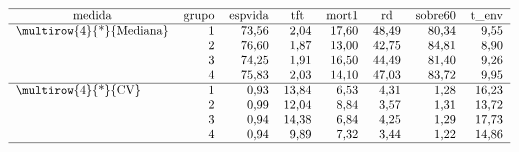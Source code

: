\documentclass[10pt,twoside]{article}
\begin{document}
\begin{table}[!ht]
\centering
\caption{Resumo estatístico das variáveis demográficas dos grupos obtidos pelo método das $k$-médias.}
\label{medg}
\[ \begin{tabular}{lrrrrrrr}
\hline
\multicolumn{1}{c}{medida} & \multicolumn{1}{c}{grupo} & \multicolumn{1}{c}{espvida} & \multicolumn{1}{c}{tft} & \multicolumn{1}{c}{mort1} & \multicolumn{1}{c}{rd} & \multicolumn{1}{c}{sobre60} & \multicolumn{1}{c}{t\_env} \\ \hline
\multirow{4}{*}{Mediana}    & 1                          & 73,56                        & 2,04                     & 17,60                      & 48,49                   & 80,34                        & 9,55                       \\
                            & 2                          & 76,60                        & 1,87                     & 13,00                      & 42,75                   & 84,81                        & 8,90                       \\
                            & 3                          & 74,25                        & 1,91                     & 16,50                      & 44,49                   & 81,40                        & 9,26                       \\
                            & 4                          & 75,83                        & 2,03                     & 14,10                      & 47,03                   & 83,72                        & 9,95                       \\ \hline
\multirow{4}{*}{CV}         & 1                          & 0,93                         & 13,84                    & 6,53                       & 4,31                    & 1,28                         & 16,23                      \\
                            & 2                          & 0,99                         & 12,04                    & 8,84                       & 3,57                    & 1,31                         & 13,72                      \\
                            & 3                          & 0,94                         & 14,38                    & 6,84                       & 4,25                    & 1,29                         & 17,73                      \\
                            & 4                          & 0,94                         & 9,89                     & 7,32                       & 3,44                    & 1,22                         & 14,86                      \\ \hline

\end{tabular}\]
\end{table}
\end{document}

